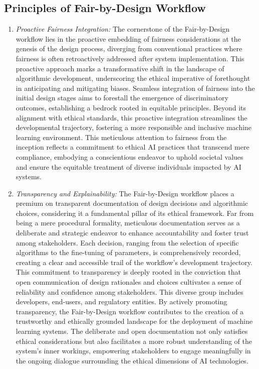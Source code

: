 \subsection{Principles of Fair-by-Design Workflow}
\label{subsection:workflow-principles}

\begin{enumerate}

    \item \emph{Proactive Fairness Integration:} The cornerstone of the Fair-by-Design workflow lies in the proactive embedding of fairness considerations at the genesis of the design process, diverging from conventional practices where fairness is often retroactively addressed after system implementation. This proactive approach marks a transformative shift in the landscape of algorithmic development, underscoring the ethical imperative of forethought in anticipating and mitigating biases. Seamless integration of fairness into the initial design stages aims to forestall the emergence of discriminatory outcomes, establishing a bedrock rooted in equitable principles. Beyond its alignment with ethical standards, this proactive integration streamlines the developmental trajectory, fostering a more responsible and inclusive machine learning environment. This meticulous attention to fairness from the inception reflects a commitment to ethical AI practices that transcend mere compliance, embodying a conscientious endeavor to uphold societal values and ensure the equitable treatment of diverse individuals impacted by AI systems.

    \item \emph{Transparency and Explainability:} The Fair-by-Design workflow places a premium on transparent documentation of design decisions and algorithmic choices, considering it a fundamental pillar of its ethical framework. Far from being a mere procedural formality, meticulous documentation serves as a deliberate and strategic endeavor to enhance accountability and foster trust among stakeholders. Each decision, ranging from the selection of specific algorithms to the fine-tuning of parameters, is comprehensively recorded, creating a clear and accessible trail of the workflow's development trajectory. This commitment to transparency is deeply rooted in the conviction that open communication of design rationales and choices cultivates a sense of reliability and confidence among stakeholders. This diverse group includes developers, end-users, and regulatory entities. By actively promoting transparency, the Fair-by-Design workflow contributes to the creation of a trustworthy and ethically grounded landscape for the deployment of machine learning systems. The deliberate and open documentation not only satisfies ethical considerations but also facilitates a more robust understanding of the system's inner workings, empowering stakeholders to engage meaningfully in the ongoing dialogue surrounding the ethical dimensions of AI technologies.


\end{enumerate}
